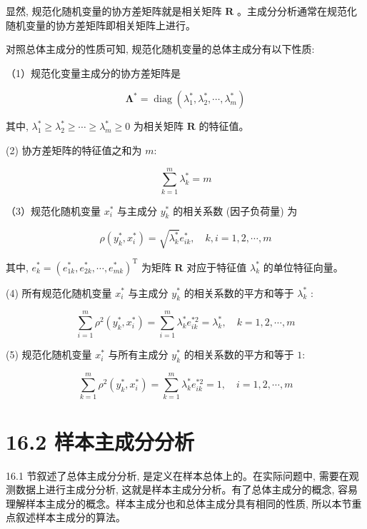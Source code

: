 \documentclass[10pt]{article}
\begin{document}
显然, 规范化随机变量的协方差矩阵就是相关矩阵 $\boldsymbol{R}$ 。主成分分析通常在规范化随机变量的协方差矩阵即相关矩阵上进行。

对照总体主成分的性质可知, 规范化随机变量的总体主成分有以下性质:

（1）规范化变量主成分的协方差矩阵是


\begin{equation*}
\boldsymbol{\Lambda}^{*}=\operatorname{diag}\left(\lambda_{1}^{*}, \lambda_{2}^{*}, \cdots, \lambda_{m}^{*}\right) \tag{16.34}
\end{equation*}


其中, $\lambda_{1}^{*} \geqslant \lambda_{2}^{*} \geqslant \cdots \geqslant \lambda_{m}^{*} \geqslant 0$ 为相关矩阵 $\boldsymbol{R}$ 的特征值。

(2) 协方差矩阵的特征值之和为 $m:$


\begin{equation*}
\sum_{k=1}^{m} \lambda_{k}^{*}=m \tag{16.35}
\end{equation*}


（3）规范化随机变量 $x_{i}^{*}$ 与主成分 $y_{k}^{*}$ 的相关系数 (因子负荷量) 为


\begin{equation*}
\rho\left(y_{k}^{*}, x_{i}^{*}\right)=\sqrt{\lambda_{k}^{*}} e_{i k}^{*}, \quad k, i=1,2, \cdots, m \tag{16.36}
\end{equation*}


其中, $e_{k}^{*}=\left(e_{1 k}^{*}, e_{2 k}^{*}, \cdots, e_{m k}^{*}\right)^{\mathrm{T}}$ 为矩阵 $\boldsymbol{R}$ 对应于特征值 $\lambda_{k}^{*}$ 的单位特征向量。

(4) 所有规范化随机变量 $x_{i}^{*}$ 与主成分 $y_{k}^{*}$ 的相关系数的平方和等于 $\lambda_{k}^{*}$ :


\begin{equation*}
\sum_{i=1}^{m} \rho^{2}\left(y_{k}^{*}, x_{i}^{*}\right)=\sum_{i=1}^{m} \lambda_{k}^{*} e_{i k}^{* 2}=\lambda_{k}^{*}, \quad k=1,2, \cdots, m \tag{16.37}
\end{equation*}


(5) 规范化随机变量 $x_{i}^{*}$ 与所有主成分 $y_{k}^{*}$ 的相关系数的平方和等于 $1:$


\begin{equation*}
\sum_{k=1}^{m} \rho^{2}\left(y_{k}^{*}, x_{i}^{*}\right)=\sum_{k=1}^{m} \lambda_{k}^{*} e_{i k}^{* 2}=1, \quad i=1,2, \cdots, m \tag{16.38}
\end{equation*}


\section*{16.2 样本主成分分析}
16.1 节叙述了总体主成分分析, 是定义在样本总体上的。在实际问题中, 需要在观测数据上进行主成分分析, 这就是样本主成分分析。有了总体主成分的概念, 容易理解样本主成分的概念。样本主成分也和总体主成分具有相同的性质, 所以本节重点叙述样本主成分的算法。
\end{document}
